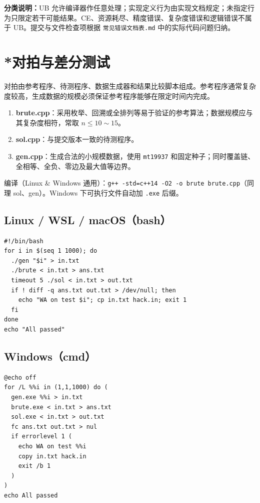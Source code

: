 \documentclass[a4paper,11pt]{article}
\newcommand{\code}[1]{\texttt{#1}}
\begin{document}
{\small\noindent\textbf{分类说明：}UB 允许编译器作任意处理；实现定义行为由实现文档规定；未指定行为只限定若干可能结果。CE、资源耗尽、精度错误、复杂度错误和逻辑错误不属于 UB。提交与文件检查项根据 \code{常见错误文档表.md} 中的实际代码问题归纳。}

\newpage
\section{*对拍与差分测试}

对拍由参考程序、待测程序、数据生成器和结果比较脚本组成。参考程序通常复杂度较高，生成数据的规模必须保证参考程序能够在限定时间内完成。

\begin{enumerate}[itemsep=2pt]
  \item \textbf{brute.cpp}：采用枚举、回溯或全排列等易于验证的参考算法；数据规模应与其复杂度相符，常取 $n\le10\sim15$。
  \item \textbf{sol.cpp}：与提交版本一致的待测程序。
  \item \textbf{gen.cpp}：生成合法的小规模数据，使用 \code{mt19937} 和固定种子；同时覆盖链、全相等、全负、零边及最大值等边界。
\end{enumerate}

编译（Linux \& Windows 通用）：\code{g++ -std=c++14 -O2 -o brute brute.cpp}（同理 sol、gen）。Windows 下可执行文件自动加 \code{.exe} 后缀。

\subsection*{Linux / WSL / macOS（bash）}

{\small
\begin{verbatim}
#!/bin/bash
for i in $(seq 1 1000); do
  ./gen "$i" > in.txt
  ./brute < in.txt > ans.txt
  timeout 5 ./sol < in.txt > out.txt
  if ! diff -q ans.txt out.txt > /dev/null; then
    echo "WA on test $i"; cp in.txt hack.in; exit 1
  fi
done
echo "All passed"
\end{verbatim}}

\subsection*{Windows（cmd）}

{\small
\begin{verbatim}
@echo off
for /L %%i in (1,1,1000) do (
  gen.exe %%i > in.txt
  brute.exe < in.txt > ans.txt
  sol.exe < in.txt > out.txt
  fc ans.txt out.txt > nul
  if errorlevel 1 (
    echo WA on test %%i
    copy in.txt hack.in
    exit /b 1
  )
)
echo All passed
\end{verbatim}}
\end{document}
